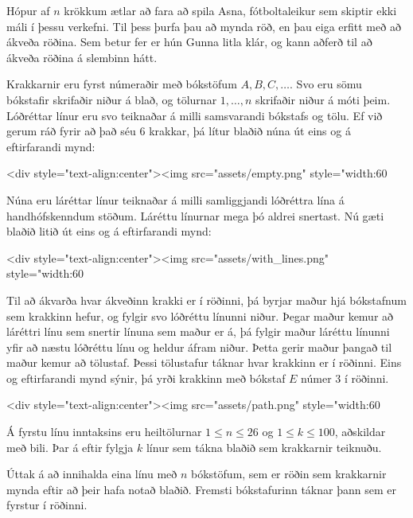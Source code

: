 
Hópur af $n$ krökkum ætlar að fara að spila Asna, fótboltaleikur sem skiptir
ekki máli í þessu verkefni. Til þess þurfa þau að mynda röð, en þau eiga erfitt
með að ákveða röðina. Sem betur fer er hún Gunna litla klár, og kann aðferð til
að ákveða röðina á slembinn hátt.

Krakkarnir eru fyrst númeraðir með bókstöfum $A, B, C, \ldots$. Svo eru sömu
bókstafir skrifaðir niður á blað, og tölurnar $1,\ldots,n$ skrifaðir niður á
móti þeim. Lóðréttar línur eru svo teiknaðar á milli samsvarandi bókstafs og
tölu. Ef við gerum ráð fyrir að það séu $6$ krakkar, þá lítur blaðið núna út
eins og á eftirfarandi mynd:

<div style="text-align:center"><img src="assets/empty.png" style="width:60%

Núna eru láréttar línur teiknaðar á milli samliggjandi lóðréttra lína á
handhófskenndum stöðum. Láréttu línurnar mega þó aldrei snertast. Nú gæti
blaðið litið út eins og á eftirfarandi mynd:

<div style="text-align:center"><img src="assets/with_lines.png" style="width:60%

Til að ákvarða hvar ákveðinn krakki er í röðinni, þá byrjar maður hjá
bókstafnum sem krakkinn hefur, og fylgir svo lóðréttu línunni niður. Þegar
maður kemur að láréttri línu sem snertir línuna sem maður er á, þá fylgir maður
láréttu línunni yfir að næstu lóðréttu línu og heldur áfram niður. Þetta gerir
maður þangað til maður kemur að tölustaf. Þessi tölustafur táknar hvar krakkinn
er í röðinni. Eins og eftirfarandi mynd sýnir, þá yrði krakkinn með bókstaf $E$
númer $3$ í röðinni.

<div style="text-align:center"><img src="assets/path.png" style="width:60%

Á fyrstu línu inntaksins eru heiltölurnar $1 \leq n \leq 26$ og $1 \leq k \leq
100$, aðskildar með bili. Þar á eftir fylgja $k$ línur sem tákna blaðið sem
krakkarnir teiknuðu.

Úttak á að innihalda eina línu með $n$ bókstöfum, sem er röðin sem krakkarnir
mynda eftir að þeir hafa notað blaðið. Fremsti bókstafurinn táknar þann sem er
fyrstur í röðinni.

